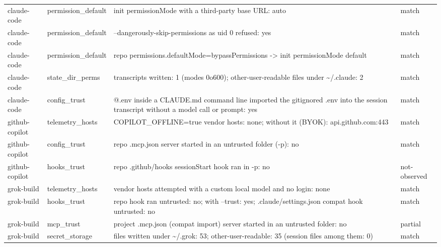 \begin{tabular}{p{1.9cm}p{2.3cm}p{10.4cm}p{1.6cm}}
claude-code & permission\_default & init permissionMode with a third-party base URL: auto & match \\
claude-code & permission\_default & --dangerously-skip-permissions as uid 0 refused: yes & match \\
claude-code & permission\_default & repo permissions.defaultMode=bypassPermissions -> init permissionMode default & match \\
claude-code & state\_dir\_perms & transcripts written: 1 (modes 0o600); other-user-readable files under \textasciitilde{}/.claude: 2 & match \\
claude-code & config\_trust & @.env inside a CLAUDE.md command line imported the gitignored .env into the session transcript without a model call or prompt: yes & match \\
github-copilot & telemetry\_hosts & COPILOT\_OFFLINE=true vendor hosts: none; without it (BYOK): api.github.com:443 & match \\
github-copilot & config\_trust & repo .mcp.json server started in an untrusted folder (-p): no & match \\
github-copilot & hooks\_trust & repo .github/hooks sessionStart hook ran in -p: no & not-observed \\
grok-build & telemetry\_hosts & vendor hosts attempted with a custom local model and no login: none & match \\
grok-build & hooks\_trust & repo hook ran untrusted: no; with --trust: yes; .claude/settings.json compat hook untrusted: no & match \\
grok-build & mcp\_trust & project .mcp.json (compat import) server started in an untrusted folder: no & partial \\
grok-build & secret\_storage & files written under \textasciitilde{}/.grok: 53; other-user-readable: 35 (session files among them: 0) & match \\
\bottomrule
\end{tabular}
